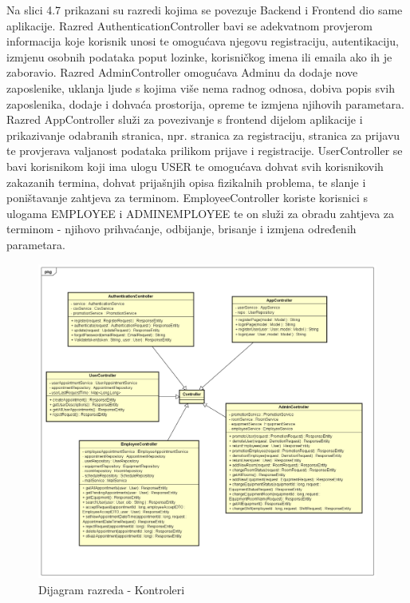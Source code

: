 			\newpage
			
			Na slici 4.7 prikazani su razredi kojima se povezuje Backend i Frontend dio same aplikacije. Razred AuthenticationController bavi se adekvatnom provjerom informacija koje korisnik unosi te omogućava njegovu registraciju, autentikaciju, izmjenu osobnih podataka poput lozinke, korisničkog imena ili emaila ako ih je zaboravio. Razred AdminController omogućava Adminu da dodaje nove zaposlenike, uklanja ljude s kojima više nema radnog odnosa, dobiva popis svih zaposlenika, dodaje i dohvaća prostorija, opreme te izmjena njihovih parametara. Razred AppController služi za povezivanje s frontend dijelom aplikacije i prikazivanje odabranih stranica, npr. stranica za registraciju, stranica za prijavu te provjerava valjanost podataka prilikom prijave i registracije. UserController se bavi korisnikom koji ima ulogu USER te omogućava dohvat svih korisnikovih zakazanih termina, dohvat prijašnjih opisa fizikalnih problema, te slanje i poništavanje zahtjeva za terminom. EmployeeController koriste korisnici s ulogama EMPLOYEE i ADMINEMPLOYEE te on služi za obradu zahtjeva za terminom - njihovo prihvaćanje, odbijanje, brisanje i izmjena određenih parametara.
			
			\begin{figure}[H]
				\includegraphics[scale=0.45]{slike/kontroleri_v2}
				\centering
				\caption{Dijagram razreda - Kontroleri}
			\end{figure}
			
